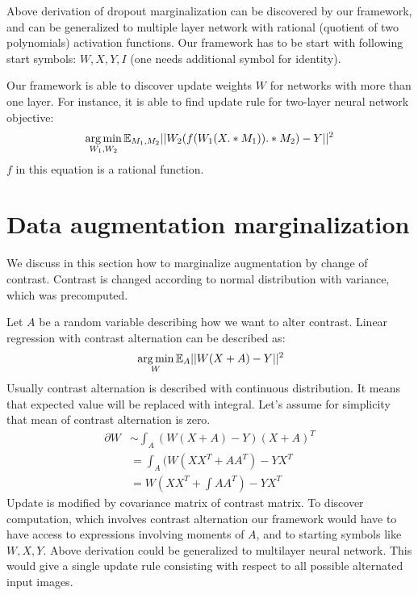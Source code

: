 Above derivation of dropout marginalization can be discovered by our framework, and can be generalized
to multiple layer network with rational (quotient of two polynomials) activation functions. Our framework
has to be start with following start symbols: $W, X, Y, I$ (one needs additional symbol for identity).


Our framework is able to discover update weights $W$ for networks with more than one layer. 
For instance, it is able to find update rule for two-layer neural network objective:
\begin{equation*}
  \operatorname*{arg\,min}_{W_1, W_2} \mathbb{E}_{M_1, M_2} ||W_2(f(W_1(X .* M_1)) .* M_2) - Y||^2
\end{equation*}
$f$ in this equation is a rational function. 


\section{Data augmentation marginalization}\label{sec:augm}
We discuss in this section how to marginalize augmentation by change of contrast. 
Contrast is changed according to normal distribution with variance, which was precomputed.


Let $A$ be a random variable describing how we want to alter contrast. Linear regression
with contrast alternation can be described as: 
\begin{align*}
& \operatorname*{arg\,min}_{W} \mathbb{E}_A ||W(X + A) - Y||^2\\
\end{align*}
Usually contrast alternation is described with continuous distribution. It means that
expected value will be replaced with integral. Let's assume for simplicity that mean 
of contrast alternation is zero.
\begin{align*}
\partial W & \sim \int_A (W(X + A) - Y)(X + A)^T \\
   & = \int_A (W(XX^T + AA^T) - YX^T \\
   & = W(XX^T + \int AA^T) - YX^T 
\end{align*}
Update is modified by covariance matrix of contrast matrix. To discover computation,
which involves contrast alternation our framework would have to have access to 
expressions involving moments of $A$, and to starting symbols like $W, X, Y$.
Above derivation could be generalized to multilayer neural network. This would
give a single update rule consisting with respect to all possible alternated
input images.

